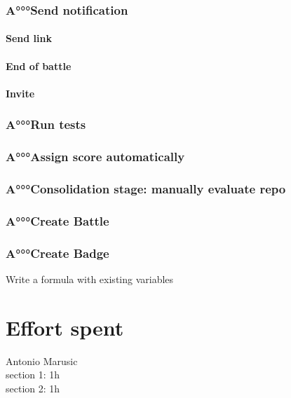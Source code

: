 \documentclass{article}
\begin{document}
            \subsubsection{A°°°Send notification}
                \paragraph*{Send link}
                \paragraph*{End of battle}
                \paragraph*{Invite}
            \subsubsection{A°°°Run tests}
            \subsubsection{A°°°Assign score automatically}
            \subsubsection{A°°°Consolidation stage: manually evaluate repo}
            \subsubsection{A°°°Create Battle}
            \subsubsection{A°°°Create Badge}
                Write a formula with existing variables



\section{Effort spent}
    Antonio Marusic\\
    section 1: 1h\\
    section 2: 1h\\
    
\end{document}
